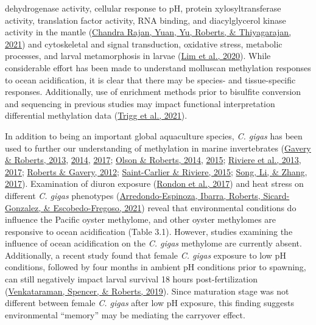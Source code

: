 \documentclass [11pt, proquest] {uwthesis}[2015/03/03]
\begin{document}
dehydrogenase activity, cellular response to pH, protein xylosyltransferase activity, translation factor activity, RNA binding, and diacylglycerol kinase activity in the mantle (\protect\hyperlink{ref-ChandraRajan2021}{Chandra Rajan, Yuan, Yu, Roberts, \& Thiyagarajan, 2021}) and cytoskeletal and signal transduction, oxidative stress, metabolic processes, and larval metamorphosis in larvae (\protect\hyperlink{ref-Lim2020}{Lim et al., 2020}). While considerable effort has been made to understand molluscan methylation responses to ocean acidification, it is clear that there may be species- and tissue-specific responses. Additionally, use of enrichment methods prior to bisulfite conversion and sequencing in previous studies may impact functional interpretation differential methylation data (\protect\hyperlink{ref-Trigg2021}{Trigg et al., 2021}).

In addition to being an important global aquaculture species, \emph{C. gigas} has been used to further our understanding of methylation in marine invertebrates (\protect\hyperlink{ref-Gavery2013}{Gavery \& Roberts, 2013}, \protect\hyperlink{ref-Gavery2014}{2014}, \protect\hyperlink{ref-Gavery2017}{2017}; \protect\hyperlink{ref-Olson2014}{Olson \& Roberts, 2014}, \protect\hyperlink{ref-Olson2015}{2015}; \protect\hyperlink{ref-Riviere2013}{Riviere et al., 2013}, \protect\hyperlink{ref-Riviere2017}{2017}; \protect\hyperlink{ref-Roberts2012}{Roberts \& Gavery, 2012}; \protect\hyperlink{ref-Saint-Carlier2015}{Saint-Carlier \& Riviere, 2015}; \protect\hyperlink{ref-Song2017}{Song, Li, \& Zhang, 2017}). Examination of diuron exposure (\protect\hyperlink{ref-Rondon2017}{Rondon et al., 2017}) and heat stress on different \emph{C. gigas} phenotypes (\protect\hyperlink{ref-Arredondo-Espinoza2021}{Arredondo-Espinoza, Ibarra, Roberts, Sicard-Gonzalez, \& Escobedo-Fregoso, 2021}) reveal that environmental conditions do influence the Pacific oyster methylome, and other oyster methylomes are responsive to ocean acidification (Table 3.1). However, studies examining the influence of ocean acidification on the \emph{C. gigas} methylome are currently absent. Additionally, a recent study found that female \emph{C. gigas} exposure to low pH conditions, followed by four months in ambient pH conditions prior to spawning, can still negatively impact larval survival 18 hours post-fertilization (\protect\hyperlink{ref-Venkataraman2019}{Venkataraman, Spencer, \& Roberts, 2019}). Since maturation stage was not different between female \emph{C. gigas} after low pH exposure, this finding suggests environmental ``memory'' may be mediating the carryover effect.
\end{document}
